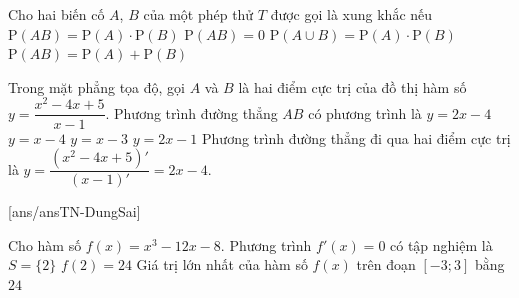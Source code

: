 \begin{ex}%
	Cho hai biến cố $A$, $B$ của một phép thử $T$ được gọi là xung khắc nếu
	\choice
	{$\mathrm{P}(AB) = \mathrm{P}(A)\cdot\mathrm{P}(B)$}
	{\True $\mathrm{P}(AB) = 0$}
	{$\mathrm{P}(A\cup B) = \mathrm{P}(A)\cdot\mathrm{P}(B)$}	
	{$\mathrm{P}(AB) = \mathrm{P}(A) + \mathrm{P}(B)$}
\end{ex}

\begin{ex}%
	Trong mặt phẳng tọa độ, gọi $A$ và $B$ là hai điểm cực trị của đồ thị hàm số $y=\dfrac{x^2-4x+5}{x-1}$. Phương trình đường thẳng $AB$ có phương trình là
	\choice
	{\True $y=2x-4$}
	{$y=x-4$}
	{$y=x-3$}
	{$y=2x-1$}
	\loigiai
	{
		Phương trình đường thẳng đi qua hai điểm cực trị là $y=\dfrac{(x^2-4x+5)'}{(x-1)'}=2x-4$.
	}
\end{ex}

\cauds
{}[ans/ansTN-DungSai]
\begin{ex}%
	Cho hàm số $f(x) = x^3 - 12x - 8$.
	{Phương trình $f'(x) = 0$ có tập nghiệm là $S = \{2\}$}
	{$f(2) = 24$}
	{Giá trị lớn nhất của hàm số $f(x)$ trên đoạn $\left[-3;3\right]$ bằng $24$}
\end{ex}

